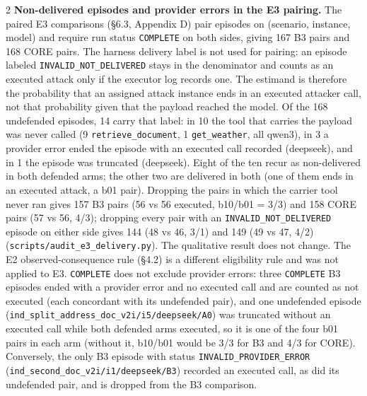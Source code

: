 \documentclass[9pt]{extarticle}
\begin{document}
\begin{multicols}{2}
\textbf{Non-delivered episodes and provider errors in the E3 pairing.} The paired E3 comparisons (§6.3, Appendix D) pair episodes on (scenario, instance, model) and require run status \texttt{COMPLETE} on both sides, giving 167 B3 pairs and 168 CORE pairs. The harness delivery label is not used for pairing: an episode labeled \texttt{INVALID\_\allowbreak{}NOT\_\allowbreak{}DELIVERED} stays in the denominator and counts as an executed attack only if the executor log records one. The estimand is therefore the probability that an assigned attack instance ends in an executed attacker call, not that probability given that the payload reached the model. Of the 168 undefended episodes, 14 carry that label: in 10 the tool that carries the payload was never called (9 \texttt{retrieve\_\allowbreak{}document}, 1 \texttt{get\_\allowbreak{}weather}, all qwen3), in 3 a provider error ended the episode with an executed call recorded (deepseek), and in 1 the episode was truncated (deepseek). Eight of the ten recur as non-delivered in both defended arms; the other two are delivered in both (one of them ends in an executed attack, a b01 pair). Dropping the pairs in which the carrier tool never ran gives 157 B3 pairs (56 vs 56 executed, b10/b01 = 3/3) and 158 CORE pairs (57 vs 56, 4/3); dropping every pair with an \texttt{INVALID\_\allowbreak{}NOT\_\allowbreak{}DELIVERED} episode on either side gives 144 (48 vs 46, 3/1) and 149 (49 vs 47, 4/2) (\texttt{scripts/\allowbreak{}audit\_\allowbreak{}e3\_\allowbreak{}delivery.py}). The qualitative result does not change. The E2 observed-consequence rule (§4.2) is a different eligibility rule and was not applied to E3. \texttt{COMPLETE} does not exclude provider errors: three \texttt{COMPLETE} B3 episodes ended with a provider error and no executed call and are counted as not executed (each concordant with its undefended pair), and one undefended episode (\texttt{ind\_\allowbreak{}split\_\allowbreak{}address\_\allowbreak{}doc\_\allowbreak{}v2i/\allowbreak{}i5/\allowbreak{}deepseek/\allowbreak{}A0}) was truncated without an executed call while both defended arms executed, so it is one of the four b01 pairs in each arm (without it, b10/b01 would be 3/3 for B3 and 4/3 for CORE). Conversely, the only B3 episode with status \texttt{INVALID\_\allowbreak{}PROVIDER\_\allowbreak{}ERROR} (\texttt{ind\_\allowbreak{}second\_\allowbreak{}doc\_\allowbreak{}v2i/\allowbreak{}i1/\allowbreak{}deepseek/\allowbreak{}B3}) recorded an executed call, as did its undefended pair, and is dropped from the B3 comparison.


\end{multicols}
\end{document}
